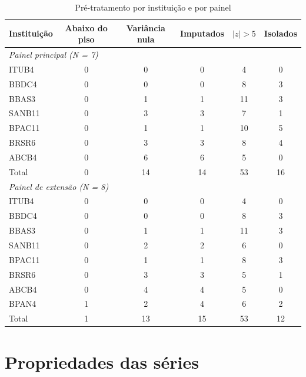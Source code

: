 \begin{table}[!htbp]
\centering
\caption{Pré-tratamento por instituição e por painel}
\label{tab:pretratamento}
\footnotesize
\renewcommand{\arraystretch}{0.9}
\begin{tabular}{lccccc}
\toprule
Instituição & Abaixo do piso & Variância nula & Imputados & $|z|>5$ & Isolados \\
\midrule
\multicolumn{6}{l}{\textit{Painel principal (N = 7)}} \\
ITUB4  & 0 &  0 &  0 &  4 &  0 \\
BBDC4  & 0 &  0 &  0 &  8 &  3 \\
BBAS3  & 0 &  1 &  1 & 11 &  3 \\
SANB11 & 0 &  3 &  3 &  7 &  1 \\
BPAC11 & 0 &  1 &  1 & 10 &  5 \\
BRSR6  & 0 &  3 &  3 &  8 &  4 \\
ABCB4  & 0 &  6 &  6 &  5 &  0 \\
Total  & 0 & 14 & 14 & 53 & 16 \\
\midrule
\multicolumn{6}{l}{\textit{Painel de extensão (N = 8)}} \\
ITUB4  & 0 &  0 &  0 &  4 &  0 \\
BBDC4  & 0 &  0 &  0 &  8 &  3 \\
BBAS3  & 0 &  1 &  1 & 11 &  3 \\
SANB11 & 0 &  2 &  2 &  6 &  0 \\
BPAC11 & 0 &  1 &  1 &  8 &  3 \\
BRSR6  & 0 &  3 &  3 &  5 &  1 \\
ABCB4  & 0 &  4 &  4 &  5 &  0 \\
BPAN4  & 1 &  2 &  4 &  6 &  2 \\
Total  & 1 & 13 & 15 & 53 & 12 \\
\bottomrule
\end{tabular}
\end{table}



\section{Propriedades das séries}
\label{sec:res-propriedades}

